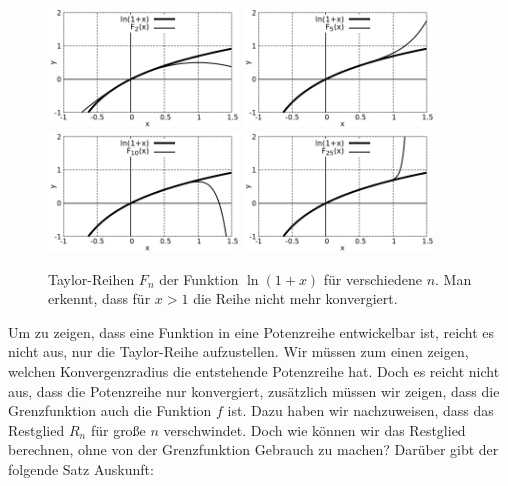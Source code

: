 \begin{figure}
    \centering
    \includegraphics[width=0.45\textwidth]{./gnuplot/taylor-expansion-log-1}
    \includegraphics[width=0.45\textwidth]{./gnuplot/taylor-expansion-log-2}
    \includegraphics[width=0.45\textwidth]{./gnuplot/taylor-expansion-log-3}
    \includegraphics[width=0.45\textwidth]{./gnuplot/taylor-expansion-log-4}
    \caption[Partialsummen von Taylorreihen]{Taylor-Reihen $F_n$ der Funktion $\ln(1+x)$ für verschiedene $n$. Man erkennt, dass für $x>1$ die Reihe nicht mehr konvergiert.}
    \label{fig:ExTaylorLog}
\end{figure}

Um zu zeigen, dass eine Funktion in eine Potenzreihe entwickelbar ist, reicht es nicht aus, nur die Taylor-Reihe aufzustellen. Wir müssen zum einen zeigen, welchen Konvergenzradius die entstehende Potenzreihe hat. Doch es reicht nicht aus, dass die Potenzreihe nur konvergiert, zusätzlich müssen wir zeigen, dass die Grenzfunktion auch die Funktion $f$ ist. Dazu haben wir nachzuweisen, dass das Restglied $R_n$ für große $n$ verschwindet. Doch wie können wir das Restglied berechnen, ohne von der Grenzfunktion Gebrauch zu machen? Darüber gibt der folgende Satz Auskunft:

